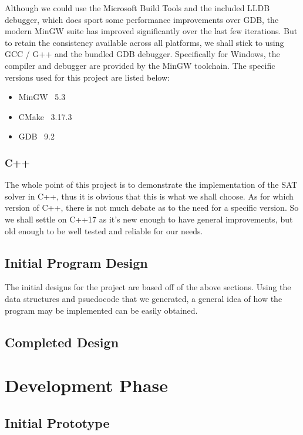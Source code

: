 \documentclass{article}
\begin{document}
Although we could use the Microsoft Build Tools and the included LLDB debugger, which does sport some performance improvements over GDB, the
modern MinGW suite has improved significantly over the last few iterations. But to retain the consistency available across all platforms,
we shall stick to using GCC / G++ and the bundled GDB debugger. Specifically for Windows, the compiler and debugger are provided by the
MinGW toolchain.
The specific versions used for this project are listed below:

\begin{itemize}
    \item MinGW \rightarrow\ 5.3
    \item CMake \rightarrow\ 3.17.3
    \item GDB \rightarrow\ 9.2
\end{itemize}

\subsubsection{C++}
The whole point of this project is to demonstrate the implementation of the SAT solver in C++, thus it is obvious that this is what we shall
choose. As for which version of C++, there is not much debate as to the need for a specific version. So we shall settle on C++17 as it's new
enough to have general improvements, but old enough to be well tested and reliable for our needs.

\subsection{Initial Program Design}
The initial designs for the project are based off of the above sections. Using the data structures and psuedocode that we generated, a
general idea of how the program may be implemented can be easily obtained.

\subsection{Completed Design}

\newpage
\section{Development Phase}
\subsection{Initial Prototype}
\end{document}
